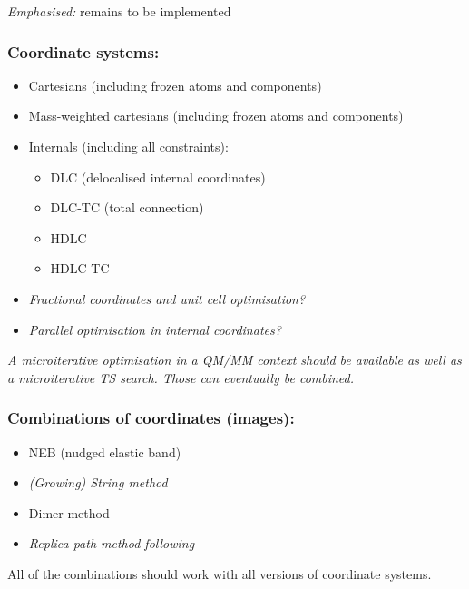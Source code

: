 \documentclass{article}
\begin{document}
\emph{Emphasised:} remains to be implemented

\subsubsection{Coordinate systems:}
\begin{itemize}
\item Cartesians (including frozen atoms and components)
\item Mass-weighted cartesians (including frozen atoms and components)
\item Internals (including all constraints): 
  \begin{itemize}
  \item DLC (delocalised internal coordinates)
  \item DLC-TC (total connection)
  \item HDLC
  \item HDLC-TC
  \end{itemize}
\item \emph{Fractional coordinates and unit cell optimisation?}
\item \emph{Parallel optimisation in internal coordinates?}
\end{itemize}

\emph{A microiterative optimisation in a QM/MM context should be available as
  well as a microiterative TS search. Those can eventually be combined.}

\subsubsection{Combinations of coordinates (images):}
\begin{itemize}
\item NEB (nudged elastic band)
\item \emph{(Growing) String method}
\item Dimer method \cite{hen99,hey05,kae08}
\item \emph{Replica path method following \cite{woo03}}
\end{itemize}
All of the combinations should work with all versions of coordinate systems.
\end{document}
